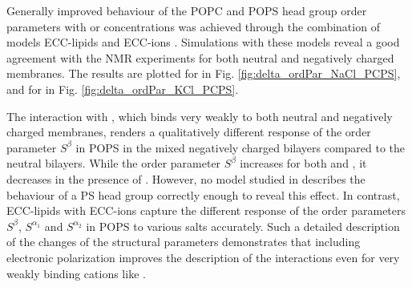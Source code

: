 \documentclass[journal=jpcbfk,manuscript=article]{achemso}
\begin{document}
Generally improved behaviour 
of the POPC and POPS head group order parameters 
with  or  concentrations 
was achieved through the combination of models 
ECC-lipids \citep{melcr18} and ECC-ions \citep{martinek17, kohagen16, Pluharova2014}. 
Simulations with these models 
reveal a good agreement with the NMR experiments 
for both neutral and negatively charged membranes.
The results are plotted for  in Fig. \ref{fig:delta_ordPar_NaCl_PCPS}, 
and for  in Fig. \ref{fig:delta_ordPar_KCl_PCPS}. 


The interaction with , which binds very weakly to both neutral and negatively charged membranes, 
renders a qualitatively different response of the order parameter $S^\beta$ in POPS in the mixed negatively charged bilayers compared to the neutral bilayers. 
While the order parameter $S^\beta$ increases for both  and ,
it decreases in the presence of .
However, no model studied in \citep{nmrlipids_proj4} describes the behaviour of a PS head group correctly enough to reveal this effect. 
In contrast, ECC-lipids with ECC-ions capture the different response of the order parameters $S^{\beta}$, $S^{\alpha _1}$ and $S^{\alpha _2}$ in POPS to various salts accurately. 
Such a detailed description of the changes of the structural parameters 
demonstrates that including electronic polarization
improves the description of the interactions even for very weakly binding cations like . 
\end{document}
